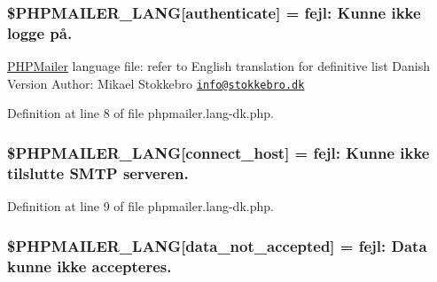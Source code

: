 \subsubsection[{\texorpdfstring{\$\+P\+H\+P\+M\+A\+I\+L\+E\+R\+\_\+\+L\+A\+NG}{$PHPMAILER_LANG}}]{\setlength{\rightskip}{0pt plus 5cm}\$P\+H\+P\+M\+A\+I\+L\+E\+R\+\_\+\+L\+A\+NG\mbox{[}\textquotesingle{}authenticate\textquotesingle{}\mbox{]} =  fejl\+: Kunne ikke logge på.\textquotesingle{}}\hypertarget{phpmailer_8lang-dk_8php_a2cb33073c989b85580748e331ed8b4aa}{}\label{phpmailer_8lang-dk_8php_a2cb33073c989b85580748e331ed8b4aa}
\hyperlink{class_p_h_p_mailer}{P\+H\+P\+Mailer} language file\+: refer to English translation for definitive list Danish Version Author\+: Mikael Stokkebro \href{mailto:info@stokkebro.dk}{\tt info@stokkebro.\+dk} 

Definition at line 8 of file phpmailer.\+lang-\/dk.\+php.

\subsubsection[{\texorpdfstring{\$\+P\+H\+P\+M\+A\+I\+L\+E\+R\+\_\+\+L\+A\+NG}{$PHPMAILER_LANG}}]{\setlength{\rightskip}{0pt plus 5cm}\$P\+H\+P\+M\+A\+I\+L\+E\+R\+\_\+\+L\+A\+NG\mbox{[}\textquotesingle{}connect\+\_\+host\textquotesingle{}\mbox{]} =  fejl\+: Kunne ikke tilslutte {\bf S\+M\+TP} serveren.\textquotesingle{}}\hypertarget{phpmailer_8lang-dk_8php_a2ee0cc637a06b96e45600db31c6799ee}{}\label{phpmailer_8lang-dk_8php_a2ee0cc637a06b96e45600db31c6799ee}


Definition at line 9 of file phpmailer.\+lang-\/dk.\+php.

\subsubsection[{\texorpdfstring{\$\+P\+H\+P\+M\+A\+I\+L\+E\+R\+\_\+\+L\+A\+NG}{$PHPMAILER_LANG}}]{\setlength{\rightskip}{0pt plus 5cm}\$P\+H\+P\+M\+A\+I\+L\+E\+R\+\_\+\+L\+A\+NG\mbox{[}\textquotesingle{}data\+\_\+not\+\_\+accepted\textquotesingle{}\mbox{]} =  fejl\+: Data kunne ikke accepteres.\textquotesingle{}}\hypertarget{phpmailer_8lang-dk_8php_a814c6b191205d2361b3233e9c9d6fda5}{}\label{phpmailer_8lang-dk_8php_a814c6b191205d2361b3233e9c9d6fda5}



